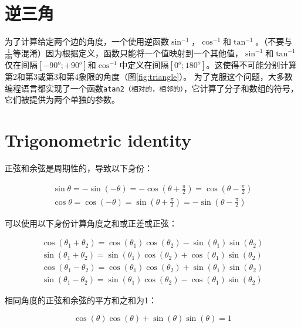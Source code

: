 \section{逆三角}
为了计算给定两个边的角度，一个使用逆函数$\sin^{-1}$，$\cos^{-1}$和$\tan^{-1}$。（不要与$\frac{1}{\sin}$等混淆）因为根据定义，函数只能将一个值映射到一个其他值，$\sin^{-1}$和$\tan^{-1}$仅在间隔$[-90^o;+90^o]$和$\cos^{-1}$中定义在间隔$[0^o;180^o]$。这使得不可能分别计算第2和第3或第3和第4象限的角度（图\ref{fig:triangle}）。
为了克服这个问题，大多数编程语言都实现了一个函数\texttt{atan2（相对的，相邻的）}，它计算了分子和数组的符号，它们被提供为两个单独的参数。


\section{Trigonometric identity}
正弦和余弦是周期性的，导致以下身份：

\begin{eqnarray}
\sin\theta=-\sin(-\theta)=-\cos(\theta+\frac{\pi}{2})=\cos(\theta-\frac{\pi}{2})\\
\cos\theta=\cos(-\theta)=\sin(\theta+\frac{\pi}{2})=-\sin(\theta-\frac{\pi}{2})
\end{eqnarray}


可以使用以下身份计算角度之和或正差或正弦：

\begin{eqnarray}
\cos(\theta_1+\theta_2)=\cos(\theta_1)\cos(\theta_2)-\sin(\theta_1)\sin(\theta_2)\\
\sin(\theta_1+\theta_2)=\sin(\theta_1)\cos(\theta_2)+\cos(\theta_1)\sin(\theta_2)\\
\cos(\theta_1-\theta_2)=\cos(\theta_1)\cos(\theta_2)+\sin(\theta_1)\sin(\theta_2)\\
\sin(\theta_1-\theta_2)=\sin(\theta_1)\cos(\theta_2)-\cos(\theta_1)\sin(\theta_2)
\end{eqnarray}


相同角度的正弦和余弦的平方和之和为1：

\begin{equation}
\cos(\theta)\cos(\theta)+\sin(\theta)\sin(\theta)=1
\end{equation}